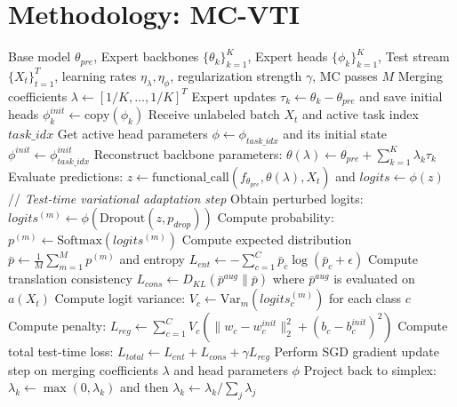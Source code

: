 \documentclass{article}
\theoremstyle{plain}
\theoremstyle{definition}
\theoremstyle{remark}
\begin{document}
\section{Methodology: MC-VTI}
\label{sec:method}
\begin{algorithm}[tb]
   \caption{MC-VTI: Monte Carlo Variational Task-Information Merging}
   \label{alg:mcvti}
\begin{algorithmic}[1] \footnotesize
    Base model $\theta_{pre}$, Expert backbones $\{\theta_k\}_{k=1}^K$, Expert heads $\{\phi_k\}_{k=1}^K$, Test stream $\{X_t\}_{t=1}^T$, learning rates $\eta_\lambda, \eta_\phi$, regularization strength $\gamma$, MC passes $M$
    Merging coefficients $\lambda \leftarrow [1/K, \dots, 1/K]^T$
    Expert updates $\tau_k \leftarrow \theta_k - \theta_{pre}$ and save initial heads $\phi^{init}_k \leftarrow \text{copy}(\phi_k)$
       \STATE Receive unlabeled batch $X_t$ and active task index $task\_idx$
       \STATE Get active head parameters $\phi \leftarrow \phi_{task\_idx}$ and its initial state $\phi^{init} \leftarrow \phi^{init}_{task\_idx}$
       \STATE Reconstruct backbone parameters: $\theta(\lambda) \leftarrow \theta_{pre} + \sum_{k=1}^K \lambda_k \tau_k$
       \STATE Evaluate predictions: $z \leftarrow \text{functional\_call}(f_{\theta_{pre}}, \theta(\lambda), X_t)$ and $logits \leftarrow \phi(z)$
       \STATE // {\itshape Test-time variational adaptation step}
           \STATE Obtain perturbed logits: $logits^{(m)} \leftarrow \phi(\text{Dropout}(z, p_{drop}))$
           \STATE Compute probability: $p^{(m)} \leftarrow \text{Softmax}(logits^{(m)})$
       \ENDFOR
       \STATE Compute expected distribution $\bar{p} \leftarrow \frac{1}{M} \sum_{m=1}^M p^{(m)}$ and entropy $L_{ent} \leftarrow - \sum_{c=1}^C \bar{p}_c \log(\bar{p}_c + \epsilon)$
       \STATE Compute translation consistency $L_{cons} \leftarrow D_{KL}(\bar{p}^{aug} \parallel \bar{p})$ where $\bar{p}^{aug}$ is evaluated on $a(X_t)$
       \STATE Compute logit variance: $V_c \leftarrow \text{Var}_m(logits_c^{(m)})$ for each class $c$
       \STATE Compute penalty: $L_{reg} \leftarrow \sum_{c=1}^C V_c \left( \| w_c - w_c^{init} \|_2^2 + (b_c - b_c^{init})^2 \right)$
       \STATE Compute total test-time loss: $L_{total} \leftarrow L_{ent} + L_{cons} + \gamma L_{reg}$
       \STATE Perform SGD gradient update step on merging coefficients $\lambda$ and head parameters $\phi$
       \STATE Project back to simplex: $\lambda_k \leftarrow \max(0, \lambda_k)$ and then $\lambda_k \leftarrow \lambda_k / \sum_j \lambda_j$
   \ENDFOR
\end{algorithmic}
\end{algorithm}
\end{document}
